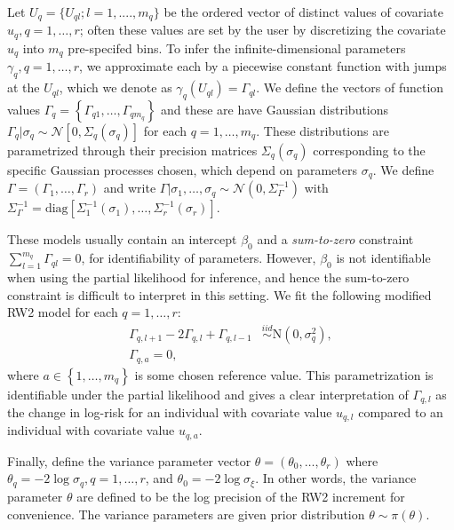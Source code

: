 \documentclass[ba]{imsart}
\begin{document}
Let $U_{q} = \{U_{ql};l = 1, ...., m_q\}$ be the ordered vector of distinct values of covariate $u_q,q = 1,\ldots,r$; often these values are set by the user by discretizing the covariate $u_q$ into $m_q$ pre-specifed bins. To infer the infinite-dimensional parameters $\gamma_{q},q = 1,\ldots,r$, we approximate each by a piecewise constant function with jumps at the $U_{ql}$, which we denote as $\gamma_{q}(U_{ql}) = \Gamma_{ql}$. We define the vectors of function values $\Gamma_{q} = \left\{ \Gamma_{q1},\ldots,\Gamma_{qm_{q}}\right\}$ and these are have Gaussian distributions $\Gamma_{q}|\sigma_{q}\sim\mathcal{N}\left[ 0,\Sigma_{q}(\sigma_{q})\right]$ for each $q = 1,\ldots,m_{q}$. These distributions are parametrized through their precision matrices $\Sigma_{q}(\sigma_{q})$ corresponding to the specific Gaussian processes chosen, which depend on parameters $\sigma_{q}$. We define $\Gamma = (\Gamma_{1},\ldots,\Gamma_{r})$ and write $\Gamma|\sigma_{1},\ldots,\sigma_{q}\sim\mathcal{N}\left( 0,\Sigma^{-1}_{\Gamma}\right)$ with $\Sigma^{-1}_{\Gamma} = \text{diag}\left[ \Sigma_{1}^{-1}(\sigma_{1}),\ldots,\Sigma_{r}^{-1}(\sigma_{r})\right]$.

These models usually contain an intercept $\beta_{0}$ and a \emph{sum-to-zero} constraint $\sum_{l=1}^{m_q}\Gamma_{ql} = 0$, for identifiability of parameters. However, $\beta_{0}$ is not identifiable when using the partial likelihood for inference, and hence the sum-to-zero constraint is difficult to interpret in this setting. We fit the following modified RW2 model for each $q = 1,\ldots,r$:
\begin{equation}\begin{aligned}\label{eqn:rw2}
\Gamma_{q,l+1} - 2\Gamma_{q,l} + \Gamma_{q,l-1} &\overset{iid}{\sim}\text{N}\left( 0,\sigma^{2}_{q}\right), \\
\Gamma_{q,a} = 0,
\end{aligned}\end{equation}
where $a\in\left\lbrace 1,\ldots,m_{q}\right\rbrace$ is some chosen reference value. This parametrization is identifiable under the partial likelihood and gives a clear interpretation of $\Gamma_{q,l}$ as the change in log-risk for an individual with covariate value $u_{q,l}$ compared to an individual with covariate value $u_{q,a}$. 

Finally, define the variance parameter vector $\theta = (\theta_{0},\ldots,\theta_{r})$ where $\theta_{q} = -2\log\sigma_{q},q = 1,\ldots,r$, and $\theta_{0} = -2\log\sigma_{\xi}$. In other words, the variance parameter $\theta$ are defined to be the log precision of the RW2 increment for convenience. The variance parameters are given prior distribution $\theta \sim \pi(\theta)$. 
\end{document}
